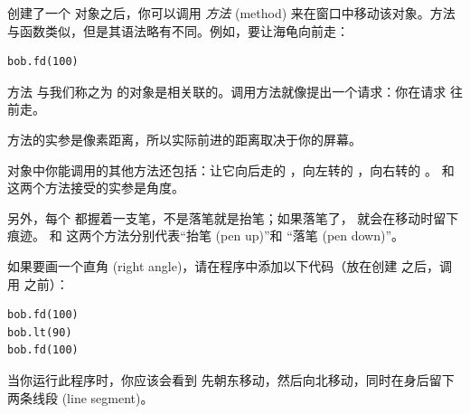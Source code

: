 创建了一个  对象之后，你可以调用 \emph{方法} (method) 来在窗口中移动该对象。方法与函数类似，但是其语法略有不同。例如，要让海龟向前走：

\begin{lstlisting}
bob.fd(100)
\end{lstlisting}


方法  与我们称之为  的对象是相关联的。调用方法就像提出一个请求：你在请求  往前走。


 方法的实参是像素距离，所以实际前进的距离取决于你的屏幕。


 对象中你能调用的其他方法还包括：让它向后走的  ，向左转的  ，向右转的  。  和  这两个方法接受的实参是角度。


另外，每个  都握着一支笔，不是落笔就是抬笔；如果落笔了，  就会在移动时留下痕迹。  和  这两个方法分别代表``抬笔 (pen up)''和 ``落笔 (pen down)''。


如果要画一个直角 (right angle)，请在程序中添加以下代码（放在创建  之后，调用  之前）：

\begin{lstlisting}
bob.fd(100)
bob.lt(90)
bob.fd(100)
\end{lstlisting}


当你运行此程序时，你应该会看到  先朝东移动，然后向北移动，同时在身后留下两条线段 (line segment)。

